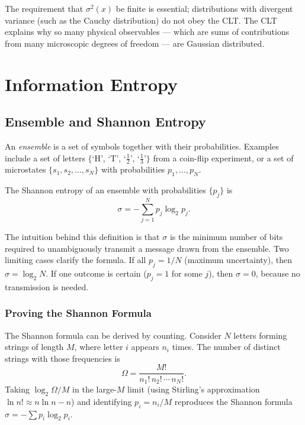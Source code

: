 The requirement that $\sigma^2(x)$ be finite is essential; distributions with divergent variance (such as the Cauchy distribution) do not obey the CLT. The CLT explains why so many physical observables — which are sums of contributions from many microscopic degrees of freedom — are Gaussian distributed.

\chapter{Information Entropy}

\section{Ensemble and Shannon Entropy}

\begin{definition}[Ensemble]
An \emph{ensemble} is a set of symbols together with their probabilities. Examples include a set of letters $\{$`H', `T', `$\frac{1}{2}$', `$\frac{1}{3}$'$\}$ from a coin-flip experiment, or a set of microstates $\{s_1, s_2, \ldots, s_N\}$ with probabilities $p_1, \ldots, p_N$.
\end{definition}

\begin{definition}
The Shannon entropy of an ensemble with probabilities $\{p_j\}$ is
\begin{equation}
    \sigma = -\sum_{j=1}^{N} p_j \log_2 p_j.
\end{equation}
\end{definition}

The intuition behind this definition is that $\sigma$ is the minimum number of bits required to unambiguously transmit a message drawn from the ensemble. Two limiting cases clarify the formula. If all $p_j = 1/N$ (maximum uncertainty), then $\sigma = \log_2 N$. If one outcome is certain ($p_j = 1$ for some $j$), then $\sigma = 0$, because no transmission is needed.

\subsection{Proving the Shannon Formula}

The Shannon formula can be derived by counting. Consider $N$ letters forming strings of length $M$, where letter $i$ appears $n_i$ times. The number of distinct strings with those frequencies is
\begin{equation}
    \Omega = \frac{M!}{n_1!\,n_2!\,\cdots\,n_N!}.
\end{equation}
Taking $\log_2 \Omega / M$ in the large-$M$ limit (using Stirling's approximation $\ln n! \approx n \ln n - n$) and identifying $p_i = n_i/M$ reproduces the Shannon formula $\sigma = -\sum p_i \log_2 p_i$.

